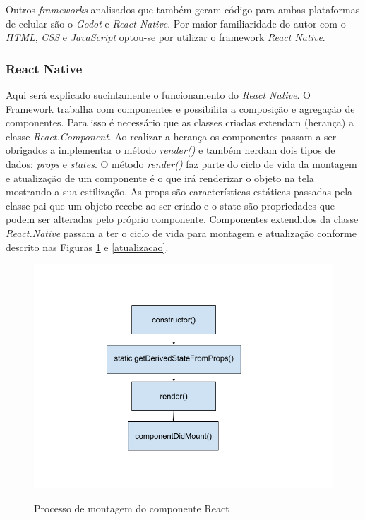 Outros \textit{frameworks} analisados que também geram código para ambas plataformas de celular são o \textit{Godot} e \textit{React Native}. Por maior familiaridade do autor com o \textit{HTML}, \textit{CSS} e \textit{JavaScript} optou-se por utilizar o framework \textit{React Native}.

\subsubsection[React Native]{React Native}
Aqui será explicado sucintamente o funcionamento do \textit{React Native}. O Framework trabalha com componentes e possibilita a composição e agregação de componentes. Para isso é necessário que as classes criadas extendam (herança) a classe \textit{React.Component}. Ao realizar a herança os componentes passam a ser obrigados a implementar o método \textit{render()} e também herdam dois tipos de dados: \textit{props} e \textit{states}. O método \textit{render()} faz parte do ciclo de vida da montagem e atualização de um componente é o que irá renderizar o objeto na tela mostrando a sua estilização. As props são características estáticas passadas pela classe pai que um objeto recebe ao ser criado e o state são propriedades que podem ser alteradas pelo próprio componente. Componentes extendidos da classe \textit{React.Native} passam a ter o ciclo de vida para montagem e atualização conforme descrito nas Figuras \ref{montagem} e \ref{atualizacao}.


\begin{figure}[H]
\centering
\caption{Processo de montagem do componente React}
\includegraphics[scale=0.7]{figuras/montagem.png}
\label{montagem}
\end{figure}

